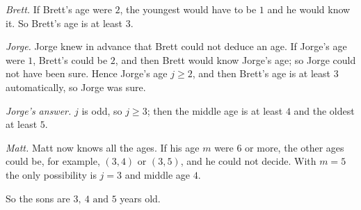 \emph{Brett.} If Brett's age were $2$, the youngest would have to be $1$ and he would know it. So Brett's age is at least $3$.

\emph{Jorge.} Jorge knew in advance that Brett could not deduce an age. If Jorge's age were $1$, Brett's could be $2$, and then Brett would know Jorge's age; so Jorge could not have been sure. Hence Jorge's age $j\ge2$, and then Brett's age is at least $3$ automatically, so Jorge was sure.

\emph{Jorge's answer.} $j$ is odd, so $j\ge3$; then the middle age is at least $4$ and the oldest at least $5$.

\emph{Matt.} Matt now knows all the ages. If his age $m$ were $6$ or more, the other ages could be, for example, $(3,4)$ or $(3,5)$, and he could not decide. With $m=5$ the only possibility is $j=3$ and middle age $4$.

So the sons are $\boxed{3,\ 4\text{ and }5}$ years old.
